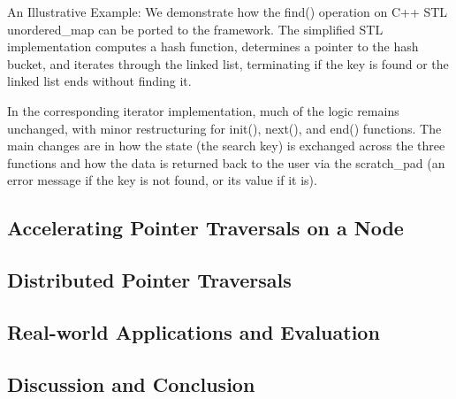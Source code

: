 An Illustrative Example: We demonstrate how the find() operation on C++ STL unordered\_map can be ported to the framework. The simplified STL implementation computes a hash function, determines a pointer to the hash bucket, and iterates through the linked list, terminating if the key is found or the linked list ends without finding it.

In the corresponding iterator implementation, much of the logic remains unchanged, with minor restructuring for init(), next(), and end() functions. The main changes are in how the state (the search key) is exchanged across the three functions and how the data is returned back to the user via the scratch\_pad (an error message if the key is not found, or its value if it is).

\subsection{Accelerating Pointer Traversals on a Node}
\subsection{Distributed Pointer Traversals}
\subsection{Real-world Applications and Evaluation}
\subsection{Discussion and Conclusion}
